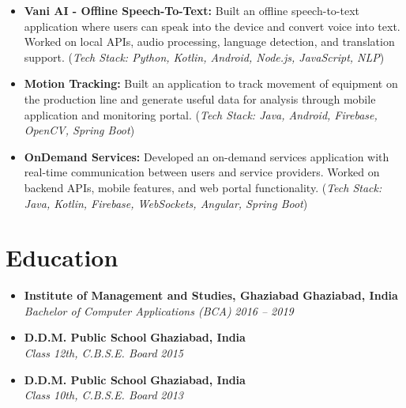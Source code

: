 \documentclass[11pt, a4paper]{article}
\begin{document}
\begin{itemize}[leftmargin=1.5em, itemsep=0.55ex, label=\textbullet]
\item \textbf{Vani AI - Offline Speech-To-Text:}
Built an offline speech-to-text application where users can speak into the device and convert voice into text. Worked on local APIs, audio processing, language detection, and translation support.
(\textit{Tech Stack: Python, Kotlin, Android, Node.js, JavaScript, NLP})

\item \textbf{Motion Tracking:}
Built an application to track movement of equipment on the production line and generate useful data for analysis through mobile application and monitoring portal.
(\textit{Tech Stack: Java, Android, Firebase, OpenCV, Spring Boot})

\item \textbf{OnDemand Services:}
Developed an on-demand services application with real-time communication between users and service providers. Worked on backend APIs, mobile features, and web portal functionality.
(\textit{Tech Stack: Java, Kotlin, Firebase, WebSockets, Angular, Spring Boot})

\end{itemize}

\section*{Education}
\begin{itemize}[leftmargin=0pt, label={}, itemsep=0.6ex]

    \item
    \textbf{Institute of Management and Studies, Ghaziabad} \hfill \textbf{Ghaziabad, India} \\
    \textit{Bachelor of Computer Applications (BCA)} \hfill \textit{2016 -- 2019}

    \item
    \textbf{D.D.M. Public School} \hfill \textbf{Ghaziabad, India} \\
    \textit{Class 12th, C.B.S.E. Board} \hfill \textit{2015}

    \item
    \textbf{D.D.M. Public School} \hfill \textbf{Ghaziabad, India} \\
    \textit{Class 10th, C.B.S.E. Board} \hfill \textit{2013}

\end{itemize}
\end{document}
